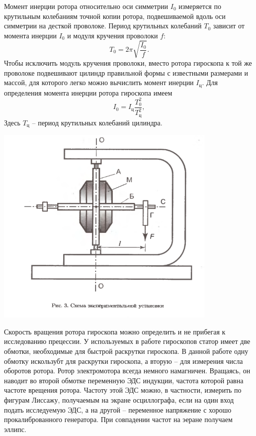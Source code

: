 \documentclass[a4paper,12pt]{article}
\begin{document}
Момент инерции ротора относительно оси симметрии $I_0$ измеряется по крутильным колебаниям точной копии ротора, подвешиваемой вдоль оси симметрии на десткой проволоке. Период крутильных колебаний $T_0$ зависит от момента инерции $I_0$ и модуля кручения проволоки $f$:
\begin{equation}
	T_0 = 2\pi\sqrt{\frac{I_0}{f}}.
\end{equation}
Чтобы исключить модуль кручения проволоки, вместо ротора гироскопа к той же проволоке подвешивают цилиндр правильной формы с известными размерами и массой, для которого легко можно вычислить момент инерции $I_\text{ц}$. Для определения момента инерции ротора гироскопа имеем
\begin{equation}
	I_0 = I_\text{ц}\frac{T_0^2}{T_\text{ц}^2},
\end{equation}
Здесь $T_\text{ц}$ -- период крутильных колебаний цилиндра.\\
\begin{center}
	\includegraphics[width=0.8\textwidth]{img3.png}
\end{center}
Скорость вращения ротора гироскопа можно определить и не прибегая к исследованию прецессии. У используемых в работе гироскопов статор имеет две обмотки, необходимые для быстрой раскрутки гироскопа. В данной работе одну обмотку искользубт для раскрутки гироскопа, а вторую -- для измерения числа оборотов ротора. Ротор электромотора всегда немного намагничен. Вращаясь, он наводит во второй обмотке переменную ЭДС индукции, частота которой равна частоте врещения ротора. Частоту этой ЭДС можно, в частности, измерить по фигурам Лиссажу, получаемым на экране осциллографа, если на один вход подать исследуемую ЭДС, а на другой -- переменное напряжение с хорошо прокалиброванного генератора. При совпадении частот на эеране получаем эллипс.
\end{document}
